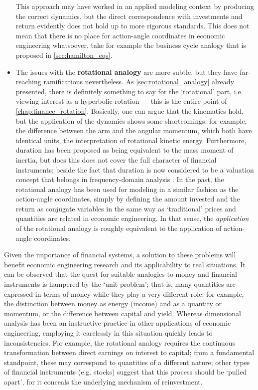 \begin{itemize}
    This approach may have worked in an applied modeling context by producing the correct dynamics, but the direct correspondence with investments and return evidently does not hold up to more rigorous standards. This does not mean that there is no place for action-angle coordinates in economic engineering whatsoever, take for example the business cycle analogy that is proposed in \cref{sec:hamilton_eqs}.
\item The issues with the \textbf{rotational analogy} are more subtle, but they have far-reaching ramifications nevertheless. As \cref{sec:rotational_analogy} already presented, there is definitely something to say for the `rotational' part, i.e. viewing interest as a hyperbolic rotation --- this is the entire point of \cref{chap:finance_rotation}. Basically, one can argue that the kinematics hold, but the application of the dynamics shows some shortcomings: for example, the difference between the arm and the angular momentum, which both have identical units, the interpretation of rotational kinetic energy. Furthermore, duration has been proposed as being equivalent to the mass moment of inertia, but does this does not cover the full character of financial instruments; beside the fact that duration is now considered to be a valuation concept that belongs in frequency-domain analysis \cite{Krabbenborg2021,Kruimer2021}. In the past, the rotational analogy has been used for modeling in a similar fashion as the action-angle coordinates, simply by defining the amount invested and the return as conjugate variables in the same way as `traditional' prices and quantities are related in economic engineering. In that sense, the \emph{application} of the rotational analogy is roughly equivalent to the application of action-angle coordinates.
\end{itemize}
Given the importance of financial systems, a solution to these problems will benefit economic engineering research and its applicability to real situations. It can be observed that the quest for suitable analogies to money and financial instruments is hampered by the `unit problem'; that is, many quantities are expressed in terms of money while they play a very different role: for example, the distinction between money as energy (income) and as a quantity or momentum, or the difference between capital and yield. Whereas dimensional analysis has been an instructive practice in other applications of economic engineering, employing it carelessly in this situation quickly leads to inconsistencies. For example, the rotational analogy requires the continuous transformation between direct earnings on interest to capital; from a fundamental standpoint, these may correspond to quantities of a different nature; other types of financial instruments (e.g. stocks) suggest that this process should be `pulled apart', for it conceals the underlying mechanism of reinvestment.

